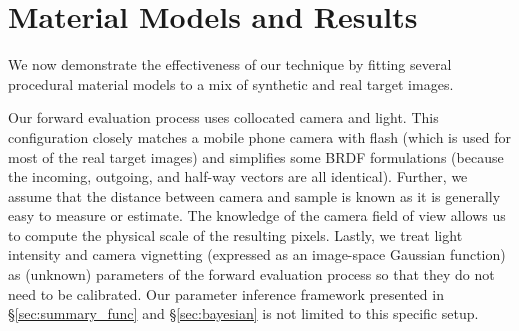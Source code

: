 

\section{Material Models and Results}
\label{sec:results}
%
We now demonstrate the effectiveness of our technique by fitting %
several procedural material models to a mix of synthetic and real target images.

Our forward evaluation process uses collocated camera and light.
This configuration closely matches a mobile phone camera with flash (which is used for most of the real target images) and simplifies some BRDF formulations (because the incoming, outgoing, and half-way vectors are all identical).
Further, we assume that the distance between camera and sample is known as it is generally easy to measure or estimate.
The knowledge of the camera field of view allows us to compute the physical scale of the resulting pixels.
Lastly, we treat light intensity and camera vignetting (expressed as an image-space Gaussian function) as (unknown) parameters of the forward evaluation process so that they do not need to be calibrated.
Our parameter inference framework presented in \S\ref{sec:summary_func} and \S\ref{sec:bayesian} is not limited to this specific setup.



